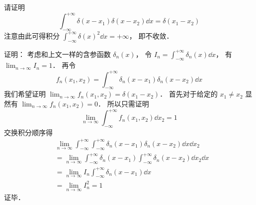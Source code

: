 \begin{example}{}
请证明
\begin{equation}\label{Delta_eq13}
\int_{-\infty}^{+\infty} \delta(x-x_1) \delta(x-x_2) \dd{x} = \delta(x_1 - x_2)
\end{equation}
注意由此可得积分 $\int_{-\infty}^{+\infty}\delta(x)^2 \dd{x} = +\infty$， 即不收敛．

证明： 考虑和上文一样的含参函数 $\delta_n(x)$， 令 $I_n = \int_{-\infty}^{+\infty} \delta_n(x) \dd{x}$， 有 $\lim_{n\to\infty} I_n = 1$． 再令
\begin{equation}
f_n(x_1, x_2) = \int_{-\infty}^{+\infty} \delta_n(x-x_1) \delta_n(x-x_2) \dd{x}
\end{equation}
我们希望证明 $\lim_{n\to\infty }f_n(x_1, x_2) = \delta(x_1 - x_2)$． 首先对于给定的 $x_1 \ne x_2$ 显然有 $\lim_{n\to\infty }f_n(x_1, x_2) = 0$． 所以只需证明
\begin{equation}
\lim_{n\to\infty }\int_{-\infty}^{+\infty} f_n(x_1, x_2) \dd{x_2} = 1
\end{equation}
交换积分顺序得
\begin{equation}
\begin{aligned}
&\lim_{n\to\infty }\int_{-\infty}^{+\infty}\int_{-\infty}^{+\infty} \delta_n(x-x_1) \delta_n(x-x_2) \dd{x}\dd{x_2}\\
&= \lim_{n\to\infty }\int_{-\infty}^{+\infty} \delta_n(x-x_1) \int_{-\infty}^{+\infty} \delta_n(x-x_2)\dd{x_2} \dd{x}\\
&= \lim_{n\to\infty } I_n \int_{-\infty}^{+\infty} \delta_n(x-x_1)\dd{x}\\
&= \lim_{n\to\infty } I_n^2 = 1
\end{aligned}
\end{equation}
证毕．
\end{example}
